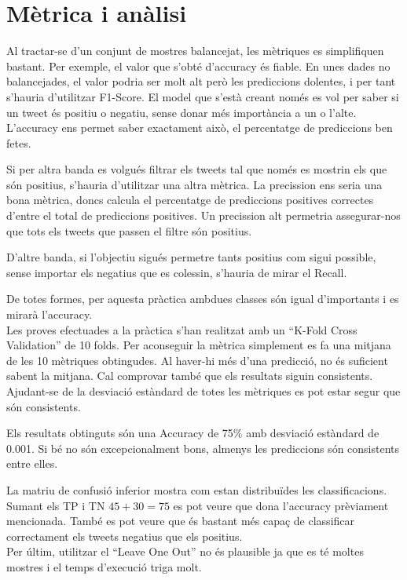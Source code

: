 \chapter{Mètrica i anàlisi}

Al tractar-se d’un conjunt de mostres balancejat, les mètriques es simplifiquen bastant. Per exemple, el valor que s’obté d’accuracy és fiable. En unes dades no balancejades, el valor podria ser molt alt però les prediccions dolentes, i per tant s’hauria d’utilitzar F1-Score. El model que s’està creant només es vol per saber si un tweet és positiu o negatiu, sense donar més importància a un o l’alte. L’accuracy ens permet saber exactament això, el percentatge de prediccions ben fetes.

Si per altra banda es volgués filtrar els tweets tal que només es mostrin els que són positius, s’hauria d’utilitzar una altra mètrica. La precission ens seria una bona mètrica, doncs calcula el percentatge de prediccions positives correctes d’entre el total de  prediccions positives. Un precission alt permetria assegurar-nos que tots els tweets que passen el filtre són positius.

D’altre banda, si l’objectiu sigués permetre tants positius com sigui possible, sense importar els negatius que es colessin, s’hauria de mirar el Recall.

De totes formes, per aquesta pràctica ambdues classes són igual d’importants i es mirarà l’accuracy.\\

Les proves efectuades a la pràctica s’han realitzat amb un  “K-Fold Cross Validation” de 10 folds. Per aconseguir la mètrica simplement es fa una mitjana de les 10 mètriques obtingudes. Al haver-hi més d’una predicció, no és suficient sabent la mitjana. Cal comprovar també que els resultats siguin consistents. Ajudant-se de la desviació estàndard de totes les mètriques es pot estar segur que són consistents.

Els resultats obtinguts són una Accuracy de 75\% amb desviació estàndard de 0.001. Si bé no són excepcionalment bons, almenys les prediccions són consistents entre elles.

La matriu de confusió inferior mostra com estan distribuïdes les classificacions. Sumant els TP i TN \(45 + 30 = 75\) es pot veure que dona l’accuracy prèviament mencionada. 
També es pot veure que és bastant més capaç de classificar correctament els tweets negatius que els positius. \\

Per últim, utilitzar el “Leave One Out” no és plausible ja que es té moltes mostres i el temps d’execució triga molt. \\

